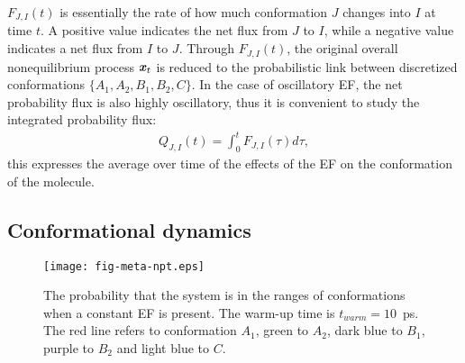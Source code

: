 \documentclass[a4paper,preprint,unsortedaddress,onecolumn]{revtex4-1}
\newcommand{\vect}[1]{\textbf{\textit{#1}}}
\begin{document}
$F_{J,I}(t)$ is essentially the rate of how much conformation $J$ changes
into $I$ at time $t$. A positive value indicates the
net flux from $J$ to $I$,
while a negative value indicates a net flux from $I$ to $J$.
Through $F_{J,I}(t)$, the original overall nonequilibrium process $\vect x_t$
is reduced to the probabilistic link between discretized conformations $\{A_1, A_2, B_1, B_2, C\}$.
In the case of oscillatory EF, the net probability flux is also highly oscillatory,
thus it is convenient to study the integrated probability flux:
\begin{align}
  Q_{J,I} (t) = \int_0^t F_{J,I}(\tau)d \tau,
\end{align}
this expresses the average over time of the effects of the EF on the conformation of the molecule.





\subsection{Conformational dynamics}


\begin{figure}
  \centering
  \texttt{[image: fig-meta-npt.eps]}
  \caption{The probability that the system is in the ranges of conformations when a constant EF is present.
    The warm-up time is $t_{warm} = 10$~ps. The red line refers to conformation $A_1$,
    green to $A_2$, dark blue to $B_1$, purple to $B_2$ and light blue
    to $C$.
  }
  \label{fig:tmp5}
\end{figure}
\end{document}
